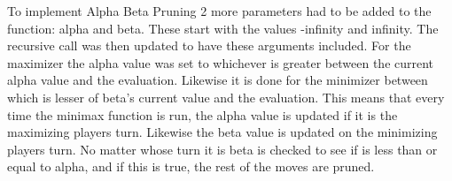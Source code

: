To implement Alpha Beta Pruning 2 more parameters had to be added to the function: alpha and beta. These start with the values -infinity and infinity.
The recursive call was then updated to have these arguments included. For the maximizer the alpha value was set to whichever is greater between the current alpha value and the evaluation.
Likewise it is done for the minimizer between which is lesser of beta's current value and the evaluation. This means that every time the minimax function is run, the alpha value is updated if it is the maximizing players turn. 
Likewise the beta value is updated on the minimizing players turn.
No matter whose turn it is beta is checked to see if is less than or equal to alpha, and if this is true, the rest of the moves are pruned.
\clearpage